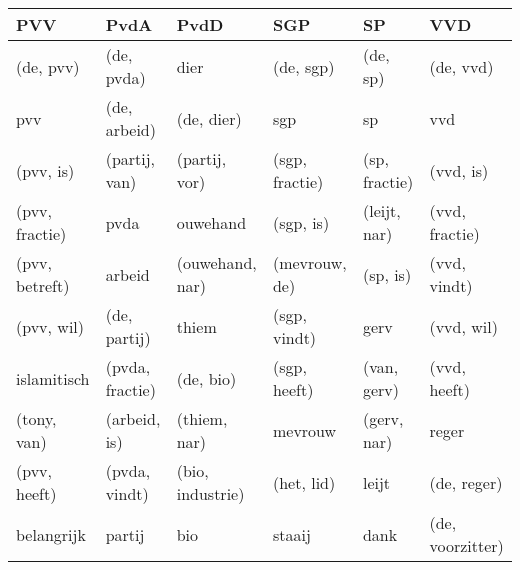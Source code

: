 \begin{tabular}{llllll}
\toprule
            PVV &             PvdA &              PvdD &             SGP &             SP &               VVD \\
\midrule
      (de, pvv) &       (de, pvda) &              dier &       (de, sgp) &       (de, sp) &         (de, vvd) \\
            pvv &     (de, arbeid) &        (de, dier) &             sgp &             sp &               vvd \\
      (pvv, is) &    (partij, van) &     (partij, vor) &  (sgp, fractie) &  (sp, fractie) &         (vvd, is) \\
 (pvv, fractie) &             pvda &          ouwehand &       (sgp, is) &   (leijt, nar) &    (vvd, fractie) \\
 (pvv, betreft) &           arbeid &   (ouwehand, nar) &   (mevrouw, de) &       (sp, is) &      (vvd, vindt) \\
     (pvv, wil) &     (de, partij) &             thiem &    (sgp, vindt) &           gerv &        (vvd, wil) \\
    islamitisch &  (pvda, fractie) &         (de, bio) &    (sgp, heeft) &    (van, gerv) &      (vvd, heeft) \\
    (tony, van) &     (arbeid, is) &      (thiem, nar) &         mevrouw &    (gerv, nar) &             reger \\
   (pvv, heeft) &    (pvda, vindt) &  (bio, industrie) &      (het, lid) &          leijt &       (de, reger) \\
     belangrijk &           partij &               bio &          staaij &           dank &  (de, voorzitter) \\
\bottomrule
\end{tabular}
